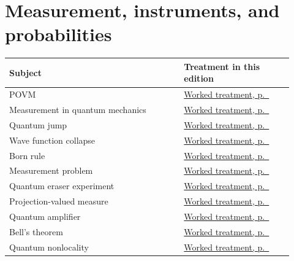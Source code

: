 \documentclass[11pt,oneside]{book}
\begin{document}
\section*{Measurement, instruments, and probabilities}
\begin{longtable}{p{0.57\linewidth}p{0.35\linewidth}}
\toprule Subject & Treatment in this edition \\
\midrule\endhead
{}\label{index:povm}POVM & \hyperref[topic:povm]{Worked treatment, p.~\pageref*{topic:povm}} \\
\label{index:measurement-in-quantum-mechanics}Measurement in quantum mechanics & \hyperref[topic:measurement-in-quantum-mechanics]{Worked treatment, p.~\pageref*{topic:measurement-in-quantum-mechanics}} \\
\label{index:quantum-jump}Quantum jump & \hyperref[topic:quantum-jump]{Worked treatment, p.~\pageref*{topic:quantum-jump}} \\
\label{index:wave-function-collapse}Wave function collapse & \hyperref[topic:wave-function-collapse]{Worked treatment, p.~\pageref*{topic:wave-function-collapse}} \\
\label{index:born-rule}Born rule & \hyperref[topic:born-rule]{Worked treatment, p.~\pageref*{topic:born-rule}} \\
\label{index:measurement-problem}Measurement problem & \hyperref[topic:measurement-problem]{Worked treatment, p.~\pageref*{topic:measurement-problem}} \\
\label{index:quantum-eraser-experiment}Quantum eraser experiment & \hyperref[topic:quantum-eraser-experiment]{Worked treatment, p.~\pageref*{topic:quantum-eraser-experiment}} \\
\label{index:projection-valued-measure}Projection-valued measure & \hyperref[topic:projection-valued-measure]{Worked treatment, p.~\pageref*{topic:projection-valued-measure}} \\
\label{index:quantum-amplifier}Quantum amplifier & \hyperref[topic:quantum-amplifier]{Worked treatment, p.~\pageref*{topic:quantum-amplifier}} \\
\label{index:bell-s-theorem}Bell's theorem & \hyperref[topic:bell-s-theorem]{Worked treatment, p.~\pageref*{topic:bell-s-theorem}} \\
\label{index:quantum-nonlocality}Quantum nonlocality & \hyperref[topic:quantum-nonlocality]{Worked treatment, p.~\pageref*{topic:quantum-nonlocality}} \\

\end{longtable}
\end{document}
